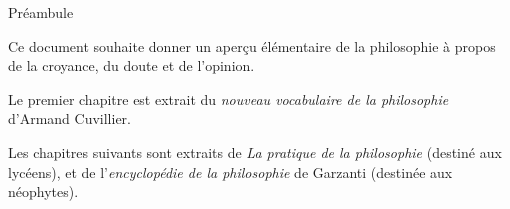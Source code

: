 
\thispagestyle{empty}

\begin{center}
\Large
Préambule
\normalsize
\end{center}
\vspace{1cm}

Ce document souhaite donner un aperçu élémentaire de la
philosophie à propos de la croyance, du doute et de l'opinion.


Le premier chapitre est extrait du {\it nouveau vocabulaire de la philosophie} d'Armand Cuvillier.

Les chapitres suivants sont extraits de {\it La pratique de la philosophie} (destiné aux
lycéens), et de l'{\it encyclopédie de la philosophie} de Garzanti (destinée aux néophytes).

\vfill

